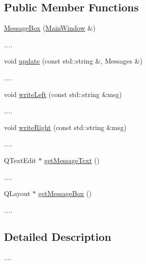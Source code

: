 \subsection*{Public Member Functions}
\begin{DoxyCompactItemize}
\item 
\hyperlink{classMessageBox_a365954e0ab751684457191dc9c3ac9bb}{Message\+Box} (\hyperlink{classMainWindow}{Main\+Window} \&)
\begin{DoxyCompactList}\small\item\em .... \end{DoxyCompactList}\item 
void \hyperlink{classMessageBox_a90cfd2a101557616ed50daeee324776f}{update} (const std\+::string \&, Messages \&)
\begin{DoxyCompactList}\small\item\em .... \end{DoxyCompactList}\item 
void \hyperlink{classMessageBox_a35154127733f5b8762490a8e9631baa4}{write\+Left} (const std\+::string \&msg)
\begin{DoxyCompactList}\small\item\em .... \end{DoxyCompactList}\item 
void \hyperlink{classMessageBox_abece1a3bb74421d5d691804e99f524af}{write\+Right} (const std\+::string \&msg)
\begin{DoxyCompactList}\small\item\em .... \end{DoxyCompactList}\item 
Q\+Text\+Edit $\ast$ \hyperlink{classMessageBox_a4d55be4beb9bfaef1db0af8296a1dcfe}{get\+Message\+Text} ()
\begin{DoxyCompactList}\small\item\em .... \end{DoxyCompactList}\item 
Q\+Layout $\ast$ \hyperlink{classMessageBox_a9a7f50ef6d07fddcd8de686698a5b887}{get\+Message\+Box} ()
\begin{DoxyCompactList}\small\item\em .... \end{DoxyCompactList}\end{DoxyCompactItemize}


\subsection{Detailed Description}
.... 

